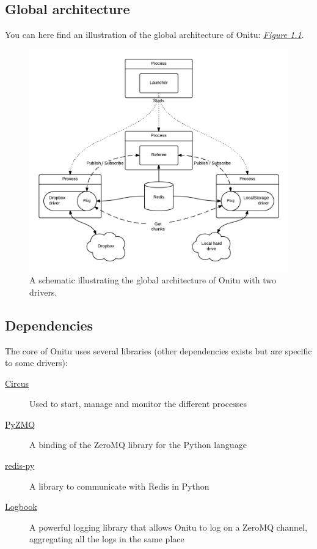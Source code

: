 \documentclass[letterpaper,10pt,english]{sphinxmanual}
\begin{document}
\subsection{Global architecture}
\label{intro:global-architecture}
You can here find an illustration of the global architecture of Onitu: {\hyperref[intro:schematic]{\emph{Figure 1.1}}}.
\begin{figure}[htbp]
\centering
\capstart

\includegraphics{global_archi.png}
\caption{A schematic illustrating the global architecture of Onitu with two drivers.}\label{intro:schematic}\end{figure}


\subsection{Dependencies}
\label{intro:dependencies}
The core of Onitu uses several libraries (other dependencies exists but are specific to some drivers):
\begin{description}
\item[{\href{http://circus.readthedocs.org}{Circus}}] \leavevmode
Used to start, manage and monitor the different processes

\item[{\href{http://github.com/zeromq/pyzmq}{PyZMQ}}] \leavevmode
A binding of the ZeroMQ library for the Python language

\item[{\href{http://github.com/andymccurdy/redis-py}{redis-py}}] \leavevmode
A library to communicate with Redis in Python

\item[{\href{http://pythonhosted.org/Logbook/}{Logbook}}] \leavevmode
A powerful logging library that allows Onitu to log on a ZeroMQ channel, aggregating all the logs in the same place

\end{description}
\end{document}
